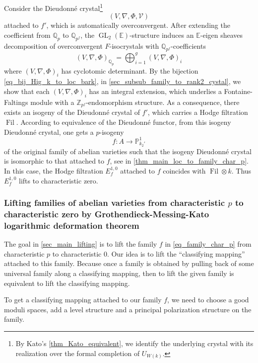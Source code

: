 \documentclass[12pt,twoside]{book}
\theoremstyle{plain}
\theoremstyle{definition}
\theoremstyle{remark}
\newcommand{\bP}{{\mathbb P}}
\newcommand{\bQ}{{\mathbb Q}}
\newcommand{\bZ}{{\mathbb Z}}
\newcommand{\mV}{{\mathcal V}}
\DeclareMathOperator\Fil{Fil}
\DeclareMathOperator\GL{GL}
\newcommand{\Qp}{{\mathbb{Q}_p}}
\numberwithin{equation}{section}
\def\EK{{\mathbb E}}
\begin{document}
Consider the Dieudonn\'e crystal\footnote{By Kato's \autoref{thm_Kato_equivalent}, we identify the underlying crystal with its realization over the formal completion of $U_{W(k)}$.}
\[(V,\nabla,\Phi,\mV)\]
attached to $f'$, which is automatically overconvergent. After extending the coefficient from $\Qp$ to $\bQ_{p^f}$, the $\GL_2(\EK)$-structure induces an $\EK$-eigen sheaves decomposition of overconvergent $F$-isocrystals with $\bQ_{p^f}$-coefficients
\[(V,\nabla,\Phi)_{\bQ_p}=\bigoplus _{i=1}^g(V,\nabla,\Phi)_{i}\]
where $(V,\nabla,\Phi)_{i}$ has cyclotomic determinant.  By the bijection \eqref{eq_bij_Hig_k_to_loc_bark}, in \autoref{sec_subsub_family_to_rank2_cystal}, we show that each $(V,\nabla,\Phi)_i$ has an integral extension, which underlies a Fontaine-Faltings module with a $\bZ_{p^f}$-endomorphism structure. As a consequence, there exists an isogeny of the Dieudonn\'e crystal of $f'$, which  carries a Hodge filtration $\Fil$. According to equivalence of the Dieudonn\'e functor, from this isogeny Dieudonn\'e crystal, one gets a $p$-isogeny 
\begin{equation} \label{eq_family_char_p}
f\colon A\to \bP^1_{k_2'}
\end{equation}
 of the original family of abelian varieties such that the isogeny Dieudonn\'e crystal is isomorphic to that attached to $f$, see  in \autoref{thm_main_loc_to_family_char_p}. In this case, the Hodge filtration $E^{1,0}_{f}$ attached to $f$ coincides with $\Fil\otimes k$. Thus $E^{1,0}_{f}$ lifts to characteristic zero.


\subsubsection{\bf Lifting families of abelian varieties from characteristic $p$ to characteristic zero by Grothendieck-Messing-Kato logarithmic deformation theorem}

The goal in \autoref{sec_main_lifting}  is to lift the family $f$ in \autoref{eq_family_char_p} from characteristic $p$ to characteristic $0$. Our idea is to lift the ``classifying mapping'' attached to this family. Because once a family is obtained by pulling back of some universal family along a classifying mapping, then to lift the given family is equivalent to lift the classifying mapping. 

To get a classifying mapping attached to our family $f$, we need to choose a good moduli spaces, add a level structure and a principal polarization structure on the family. 
\end{document}
